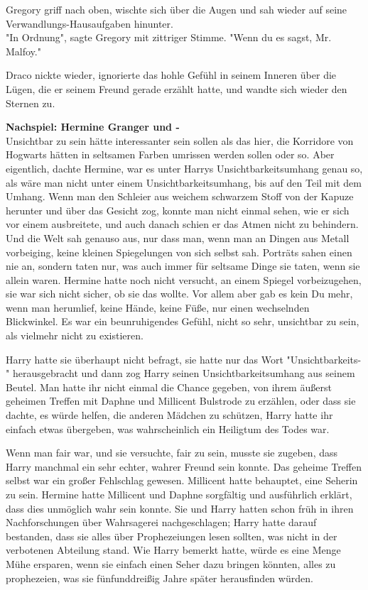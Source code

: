 {Gregory griff nach oben, wischte sich über die Augen und sah wieder auf seine Verwandlungs-Hausaufgaben hinunter.\\ "In Ordnung", sagte Gregory mit zittriger Stimme. "Wenn du es sagst, Mr. Malfoy."

Draco nickte wieder, ignorierte das hohle Gefühl in seinem Inneren über die Lügen, die er seinem Freund gerade erzählt hatte, und wandte sich wieder den Sternen zu.

\textbf{Nachspiel: Hermine Granger und -}\\ Unsichtbar zu sein hätte interessanter sein sollen als das hier, die Korridore von Hogwarts hätten in seltsamen Farben umrissen werden sollen oder so. Aber eigentlich, dachte Hermine, war es unter Harrys Unsichtbarkeitsumhang genau so, als wäre man nicht unter einem Unsichtbarkeitsumhang, bis auf den Teil mit dem Umhang. Wenn man den Schleier aus weichem schwarzem Stoff von der Kapuze herunter und über das Gesicht zog, konnte man nicht einmal sehen, wie er sich vor einem ausbreitete, und auch danach schien er das Atmen nicht zu behindern. Und die Welt sah genauso aus, nur dass man, wenn man an Dingen aus Metall vorbeiging, keine kleinen Spiegelungen von sich selbst sah. Porträts sahen einen nie an, sondern taten nur, was auch immer für seltsame Dinge sie taten, wenn sie allein waren. Hermine hatte noch nicht versucht, an einem Spiegel vorbeizugehen, sie war sich nicht sicher, ob sie das wollte. Vor allem aber gab es kein Du mehr, wenn man herumlief, keine Hände, keine Füße, nur einen wechselnden Blickwinkel. Es war ein beunruhigendes Gefühl, nicht so sehr, unsichtbar zu sein, als vielmehr nicht zu existieren.

Harry hatte sie überhaupt nicht befragt, sie hatte nur das Wort "Unsichtbarkeits-" herausgebracht und dann zog Harry seinen Unsichtbarkeitsumhang aus seinem Beutel. Man hatte ihr nicht einmal die Chance gegeben, von ihrem äußerst geheimen Treffen mit Daphne und Millicent Bulstrode zu erzählen, oder dass sie dachte, es würde helfen, die anderen Mädchen zu schützen, Harry hatte ihr einfach etwas übergeben, was wahrscheinlich ein Heiligtum des Todes war.

Wenn man fair war, und sie versuchte, fair zu sein, musste sie zugeben, dass Harry manchmal ein sehr echter, wahrer Freund sein konnte. Das geheime Treffen selbst war ein großer Fehlschlag gewesen. Millicent hatte behauptet, eine Seherin zu sein. Hermine hatte Millicent und Daphne sorgfältig und ausführlich erklärt, dass dies unmöglich wahr sein konnte. Sie und Harry hatten schon früh in ihren Nachforschungen über Wahrsagerei nachgeschlagen; Harry hatte darauf bestanden, dass sie alles über Prophezeiungen lesen sollten, was nicht in der verbotenen Abteilung stand. Wie Harry bemerkt hatte, würde es eine Menge Mühe ersparen, wenn sie einfach einen Seher dazu bringen könnten, alles zu prophezeien, was sie fünfunddreißig Jahre später herausfinden würden.

}

